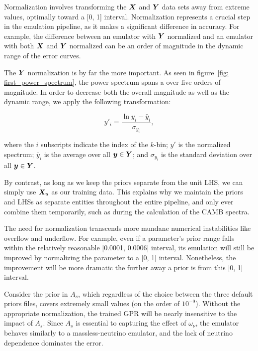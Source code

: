 Normalization involves transforming the $\bm{X}$ and $\bm{Y}$ data sets
away from extreme values, optimally toward a [0, 1] interval.
Normalization represents a crucial step in the emulation pipeline,
as it makes a significant difference in accuracy. For example, the difference
between an emulator with $\bm{Y}$ normalized and an emulator with
both $\bm{X}$ and $\bm{Y}$ normalized can be an order of magnitude in the
dynamic range of the error curves. 

The $\bm{Y}$ normalization is by far the more important. As seen in
figure~\ref{fig: first_power_spectrum}, the power spectrum spans a over five
orders of magnitude. In order to decrease both the overall magnitude as well
as the dynamic range, we apply the following transformation:

\begin{equation}
\label{eq: y_normalization}
y'_i = \frac{\ln{y_i} - \bar{y}_i}{\sigma_{y_i}}
,\end{equation}

where the $i$ subscripts indicate the index of the $k$-bin; $y'$ is the 
normalized spectrum; $\bar{y}_i$ is the average over all
$\bm{y} \in \bm{Y}$; and $\sigma_{y_i}$ is the 
standard deviation over all $\bm{y} \in \bm{Y}$.

By contrast, as long as we keep the priors separate from the unit LHS, we can
simply use $\bm{X}_u$ as our training data. This explains why we
maintain the priors and LHSs as separate entities throughout the entire
pipeline, and only ever combine them temporarily, such as during the
calculation of the CAMB spectra. 

The need for normalization transcends more mundane numerical instabilities
like overflow and underflow. For example, even if a parameter's 
prior range falls within the relatively reasonable [0.0001, 0.0006] interval, 
its emulation will still be improved by normalizing the parameter to a [0, 1] 
interval. Nonetheless, the improvement will be more dramatic the further away 
a prior is from this [0, 1] interval.

Consider the prior in $A_s$, which 
regardless of the choice between the three default priors files, covers 
extremely small values (on the order of $10^{-9}$). Without the appropriate 
normalization, the trained GPR will be nearly insensitive to the impact of 
$A_s$. Since $A_s$ is essential to capturing the effect of $\omega_\nu$,
the emulator behaves similarly to a massless-neutrino emulator, and the lack 
of neutrino dependence dominates the error.

